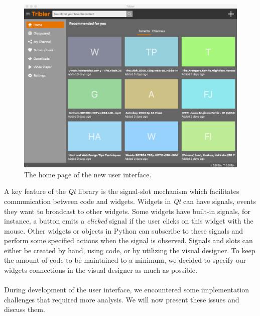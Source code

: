 \begin{figure}[t]
	\centering
	\includegraphics[width=1.0\columnwidth]{images/improving_qa/newgui1}
	\caption{The home page of the new user interface.}
	\label{fig:new-gui-1}
\end{figure}

A key feature of the \emph{Qt} library is the signal-slot mechanism which facilitates communication between code and widgets. Widgets in \emph{Qt} can have signals, events they want to broadcast to other widgets. Some widgets have built-in signals, for instance, a button emits a \emph{clicked} signal if the user clicks on this widget with the mouse. Other widgets or objects in Python can subscribe to these signals and perform some specified actions when the signal is observed.  Signals and slots can either be created by hand, using code, or by utilizing the visual designer. To keep the amount of code to be maintained to a minimum, we decided to specify our widgets connections in the visual designer as much as possible.\\\\
During development of the user interface, we encountered some implementation challenges that required more analysis. We will now present these issues and discuss them.

